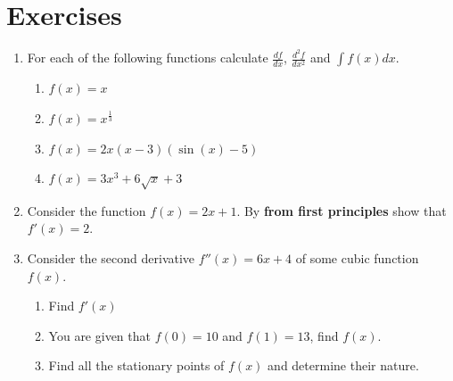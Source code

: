 \section{Exercises}
\label{\detokenize{tools-for-mathematics/03-calculus/exercises/main:exercises}}\label{\detokenize{tools-for-mathematics/03-calculus/exercises/main::doc}}
\begin{enumerate}

\item 

For each of the following functions calculate \(\frac{df}{dx}\), \(\frac{d^2f}{dx^2}\) and \(\int f(x) dx\).
\begin{enumerate}

\item 

\(f(x) = x\)

\item 

\(f(x) = x ^{\frac{1}{3}}\)

\item 

\(f(x) = 2 x (x - 3) (\sin(x) - 5)\)

\item 

\(f(x) = 3  x ^ 3 + 6 \sqrt{x} + 3\)

\end{enumerate}

\item 

Consider the function \(f(x)=2x+1\). By  \textbf{from first principles} show that \(f'(x)=2\).

\item 

Consider the second derivative \(f''(x)=6x+4\) of some cubic function \(f(x)\).
\begin{enumerate}

\item 

Find \(f'(x)\)

\item 

You are given that \(f(0)=10\) and \(f(1)=13\), find \(f(x)\).

\item 

Find all the stationary points of \(f(x)\) and determine their nature.

\end{enumerate}


\end{enumerate}
